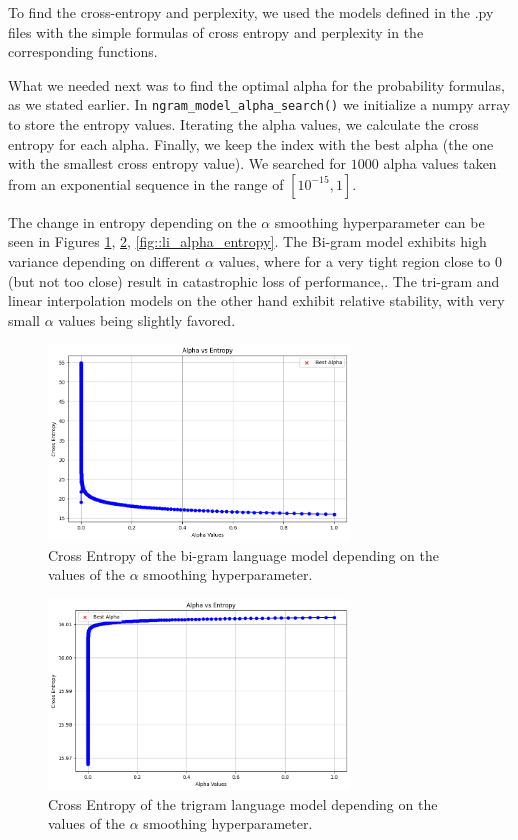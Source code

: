\documentclass[11pt, a4paper]{article}
\begin{document}
	To find the cross-entropy and perplexity, we used the models defined in the .py files with the simple formulas of cross entropy and perplexity in the corresponding functions. 
	
	What we needed next was to find the optimal alpha for the probability formulas, as we stated earlier. In \texttt{ngram\_model\_alpha\_search()} we initialize a numpy array to store the entropy values. Iterating the alpha values, we calculate the cross entropy for each alpha. Finally, we keep the index with the best alpha (the one with the smallest cross entropy value). We searched for $1000$ alpha values taken from an exponential sequence in the range of $[10^{-15}, 1]$. 
	
	The change in entropy depending on the $\alpha$ smoothing hyperparameter can be seen in Figures \ref{fig::bi_alpha_entropy}, \ref{fig::tri_alpha_entropy}, \ref{fig::li_alpha_entropy}. The Bi-gram model exhibits high variance depending on different $\alpha$ values, where for a very tight region close to 0 (but not too close) result in catastrophic loss of performance,. The tri-gram and linear interpolation models on the other hand exhibit relative stability, with very small $\alpha$ values being slightly favored.
	

	 \begin{figure}
	    \centering
	    \includegraphics[width=8cm]{"bi_alpha.png"}
	    \caption{Cross Entropy of the bi-gram language model depending on the values of the $\alpha$ smoothing hyperparameter.}
	    \label{fig::bi_alpha_entropy}
	\end{figure}

	\begin{figure}
		\centering
		\includegraphics[width=8cm]{"tri_alpha.png"}
		\caption{Cross Entropy of the trigram language model depending on the values of the $\alpha$ smoothing hyperparameter.}
		\label{fig::tri_alpha_entropy}
	\end{figure}
	
\end{document}
